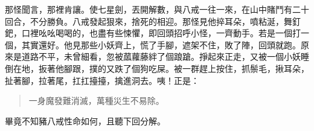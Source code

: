 那怪聞言，那裡肯讓。使七星劍，丟開解數，與八戒一往一來，在山中賭鬥有二十回合，不分勝負。八戒發起狠來，捨死的相迎。那怪見他捽耳朵，噴粘涎，舞釘鈀，口裡吆吆喝喝的，也盡有些悚懼，即回頭招呼小怪，一齊動手。若是一個打一個，其實還好。他見那些小妖齊上，慌了手腳，遮架不住，敗了陣，回頭就跑。原來是道路不平，未曾細看，忽被蓏蘿藤絆了個踉蹌。掙起來正走，又被一個小妖睡倒在地，扳著他腳跟，撲的又跌了個狗吃屎。被一群趕上按住，抓鬃毛，揪耳朵，扯著腳，拉著尾，扛扛擡擡，擒進洞去。咦！正是：
\begin{quote}
一身魔發難消滅，萬種災生不易除。
\end{quote}

畢竟不知豬八戒性命如何，且聽下回分解。
